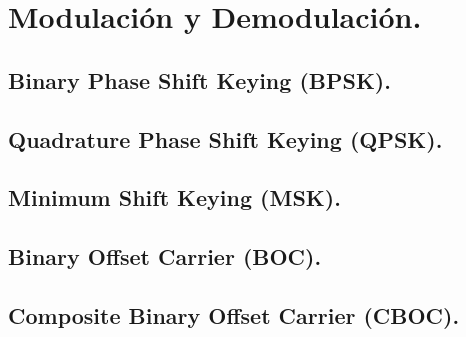 \section*{\fontsize{12}{18}\selectfont Modulación y Demodulación.}

\begin{justify}
\end{justify}

\subsection*{\fontsize{12}{18}\selectfont Binary Phase Shift Keying (BPSK).}

\begin{justify}
\end{justify}

\subsection*{\fontsize{12}{18}\selectfont Quadrature Phase Shift Keying (QPSK).}

\begin{justify}
\end{justify}

\subsection*{\fontsize{12}{18}\selectfont Minimum Shift Keying (MSK).}

\begin{justify}
\end{justify}

\subsection*{\fontsize{12}{18}\selectfont Binary Offset Carrier (BOC).}

\begin{justify}
\end{justify}

\subsection*{\fontsize{12}{18}\selectfont Composite Binary Offset Carrier (CBOC).}

\begin{justify}
\end{justify}